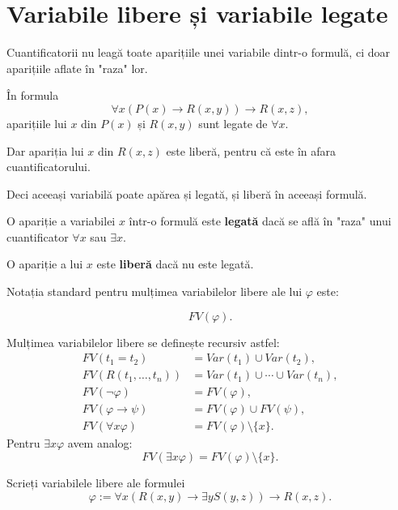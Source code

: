 \section{Variabile libere și variabile legate}

Cuantificatorii nu leagă toate aparițiile unei variabile dintr-o formulă, ci doar aparițiile aflate în "raza" lor.

\begin{eg}
	În formula
	\[
		\forall x(P(x) \to R(x,y)) \to R(x,z),
	\]
	aparițiile lui \(x\) din \(P(x)\) și \(R(x,y)\) sunt legate de \( \forall x \).

	Dar apariția lui \(x\) din \(R(x,z)\) este liberă, pentru că este în afara cuantificatorului.

	Deci aceeași variabilă poate apărea și legată, și liberă în aceeași formulă.
\end{eg}

\begin{definition}
	O apariție a variabilei \(x\) într-o formulă este \textbf{legată} dacă se află în "raza" unui cuantificator \( \forall x \) sau \( \exists x \).

	O apariție a lui \(x\) este \textbf{liberă} dacă nu este legată.
\end{definition}

Notația standard pentru mulțimea variabilelor libere ale lui \( \varphi \) este:

\[
	FV(\varphi).
\]

\newpage

\begin{definition}
	Mulțimea variabilelor libere se definește recursiv astfel:
	\begin{align*}
		FV(t_1=t_2)           & = Var(t_1) \cup Var(t_2),             \\
		FV(R(t_1,\dots,t_n))  & = Var(t_1) \cup \cdots \cup Var(t_n), \\
		FV(\neg \varphi)      & = FV(\varphi),                        \\
		FV(\varphi \to \psi)  & = FV(\varphi) \cup FV(\psi),          \\
		FV(\forall x \varphi) & = FV(\varphi)\setminus \{x\}.
	\end{align*}
	Pentru \( \exists x \varphi \) avem analog:
	\[
		FV(\exists x \varphi)=FV(\varphi)\setminus \{x\}.
	\]
\end{definition}

\begin{ex}
	Scrieți variabilele libere ale formulei
	\[
		\varphi := \forall x(R(x,y) \to \exists y S(y,z)) \to R(x,z).
	\]
\end{ex}

